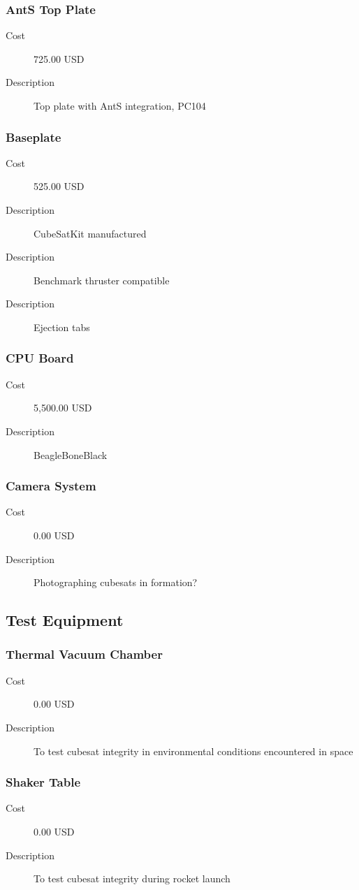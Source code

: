 \subsubsection{AntS Top Plate}
\begin{description}
\item[Cost] 725.00 USD
\item[Description] Top plate with AntS integration, PC104
\end{description}

\subsubsection{Baseplate}
\begin{description}
\item[Cost] 525.00 USD
\item[Description] CubeSatKit manufactured
\item[Description] Benchmark thruster compatible
\item[Description] Ejection tabs
\end{description}

\subsubsection{CPU Board}
\begin{description}
\item[Cost] 5,500.00 USD
\item[Description] BeagleBoneBlack
\end{description}

\subsubsection{Camera System}
\begin{description}
\item[Cost] 0.00 USD
\item[Description] Photographing cubesats in formation?
\end{description}


\subsection{Test Equipment}

\subsubsection{Thermal Vacuum Chamber}
\begin{description}
\item[Cost] 0.00 USD
\item[Description] To test cubesat integrity in environmental conditions encountered in space
\end{description}

\subsubsection{Shaker Table}
\begin{description}
\item[Cost] 0.00 USD
\item[Description] To test cubesat integrity during rocket launch
\end{description}

